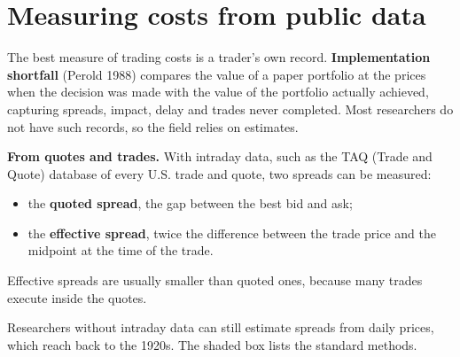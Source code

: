 \section{Measuring costs from public data}
\label{sec:17-measuring}

The best measure of trading costs is a trader's own record. \textbf{Implementation shortfall} (Perold 1988) compares the value of a paper portfolio at the prices when the decision was made with the value of the portfolio actually achieved, capturing spreads, impact, delay and trades never completed. Most researchers do not have such records, so the field relies on estimates.

\textbf{From quotes and trades.} With intraday data, such as the TAQ (Trade and Quote) database of every U.S. trade and quote, two spreads can be measured:

\begin{itemize}
  \item the \textbf{quoted spread}, the gap between the best bid and ask;
  \item the \textbf{effective spread}, twice the difference between the trade price and the midpoint at the time of the trade.
\end{itemize}

Effective spreads are usually smaller than quoted ones, because many trades execute inside the quotes.

Researchers without intraday data can still estimate spreads from daily prices, which reach back to the 1920s. The shaded box lists the standard methods.


